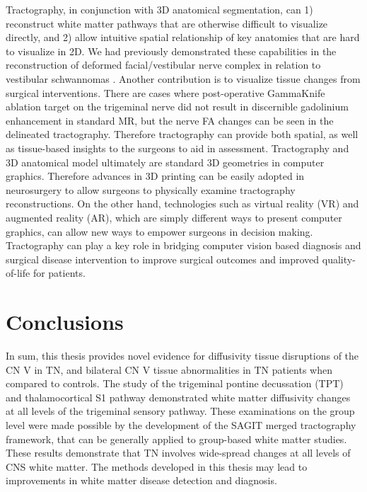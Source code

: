 Tractography, in conjunction with 3D anatomical segmentation, can 1) reconstruct white matter pathways that are otherwise difficult to visualize directly, and 2) allow intuitive spatial relationship of key anatomies that are hard to visualize in 2D. We had previously demonstrated these capabilities in the reconstruction of deformed facial/vestibular nerve complex in relation to vestibular schwannomas \cite{Chen2011b,Behan2017}.
Another contribution is to visualize tissue changes from surgical interventions. There are cases where post-operative GammaKnife ablation target on the trigeminal nerve did not result in discernible gadolinium enhancement in standard MR, but the nerve FA changes can be seen in the delineated tractography. Therefore tractography can provide both spatial, as well as tissue-based insights to the surgeons to aid in assessment.
Tractography and 3D anatomical model ultimately are standard 3D geometries in computer graphics. Therefore advances in 3D printing can be easily adopted in neurosurgery to allow surgeons to physically examine tractography reconstructions. On the other hand, technologies such as virtual reality (VR) and augmented reality (AR), which are simply different ways to present computer graphics, can allow new ways to empower surgeons in decision making. Tractography can play a key role in bridging computer vision based diagnosis and surgical disease intervention to improve surgical outcomes and improved quality-of-life for patients.   

\section{Conclusions}

In sum, this thesis provides novel evidence for diffusivity tissue disruptions of the CN V in TN, and bilateral CN V tissue abnormalities in TN patients when compared to controls. The study of the trigeminal pontine decussation (TPT) and thalamocortical S1 pathway demonstrated white matter diffusivity changes at all levels of the trigeminal sensory pathway. These examinations on the group level were made possible by the development of the SAGIT merged tractography framework, that can be generally applied to group-based white matter studies. These results demonstrate that TN involves wide-spread changes at all levels of CNS white matter. The methods developed in this thesis may lead to improvements in white matter disease detection and diagnosis.